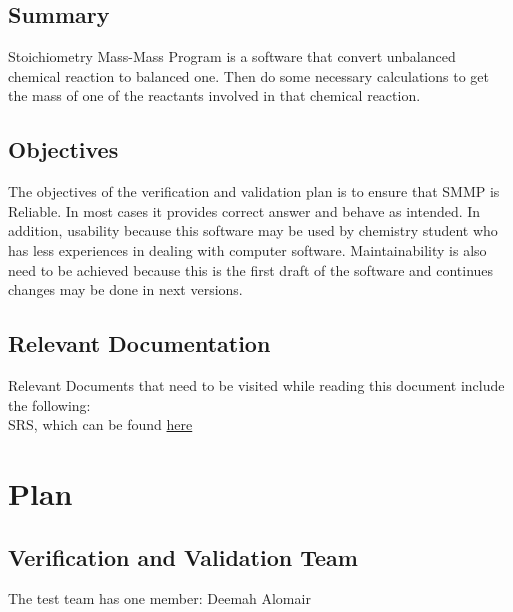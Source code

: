 \documentclass[12pt, titlepage]{article}
\begin{document}
\subsection{Summary}

Stoichiometry Mass-Mass Program is a software that convert unbalanced chemical
reaction to balanced one. Then do some necessary calculations to get the mass of
one of the reactants involved in that chemical reaction.

\subsection{Objectives}

The objectives of the verification and validation plan is to ensure that SMMP is
Reliable. In most cases it provides correct answer and behave as intended. In
addition, usability because this software may be used by chemistry student who
has less experiences in dealing with computer software. Maintainability is also
need to be achieved because this is the first draft of the software and
continues changes may be done in next versions.

\subsection{Relevant Documentation}

Relevant Documents that need to be visited while reading this document include
the following:\\

 SRS, which can be found
\href{https://github.com/deemaalomair1/CAS741_project/tree/master/docs/SRS}{here}
 

\section{Plan}


\subsection{Verification and Validation Team}

The test team has one member: Deemah Alomair
\end{document}
